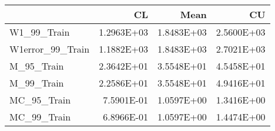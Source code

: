 \begin{tabular}{lrrr}
\toprule
{} &         CL &       Mean &         CU \\
\midrule
W1\_99\_Train      & 1.2963E+03 & 1.8483E+03 & 2.5600E+03 \\
W1error\_99\_Train & 1.1882E+03 & 1.8483E+03 & 2.7021E+03 \\
M\_95\_Train       & 2.3642E+01 & 3.5548E+01 & 4.5458E+01 \\
M\_99\_Train       & 2.2586E+01 & 3.5548E+01 & 4.9416E+01 \\
MC\_95\_Train      & 7.5901E-01 & 1.0597E+00 & 1.3416E+00 \\
MC\_99\_Train      & 6.8966E-01 & 1.0597E+00 & 1.4474E+00 \\
\bottomrule
\end{tabular}
